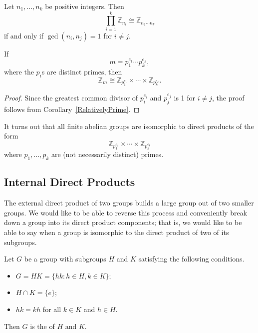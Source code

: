\begin{corollary}\label{RelativelyPrime}
Let $n_1, \ldots, n_k$ be positive integers. Then
\[
\prod_{i=1}^k {\mathbb Z}_{n_i} \cong {\mathbb Z}_{n_1 \cdots n_k}
\]
if and only if $\gcd( n_i, n_j) =1$ for $i \neq j$.
\end{corollary}

 
\begin{corollary}
If
\[
m = p_1^{e_1} \cdots  p_k^{e_k},
\]
where the $p_i$s are distinct primes, then
\[
{\mathbb Z}_m \cong {\mathbb Z}_{p_1^{e_1}} \times \cdots \times {\mathbb
Z}_{p_k^{e_k}}.
\]
\end{corollary}
 
 
\begin{proof}
Since the greatest common divisor of $p_i^{e_i}$ and $p_j^{e_j}$ is
1 for $i \neq j$, the proof follows from Corollary~\ref{RelativelyPrime}.
\end{proof}


\medskip


It turns out that all finite abelian groups are 
isomorphic to direct products of
the form
\[
{\mathbb Z}_{p_1^{e_1}} \times \cdots \times {\mathbb
Z}_{p_k^{e_k}}
\]
where $p_1, \ldots, p_k$ are (not necessarily distinct) primes.

 
 
\subsection{Internal Direct Products}
 

The external direct product of two groups builds a large group out of
two smaller groups.   We would like to be able to reverse this process
and conveniently break down a group into its direct product
components; that is, we would like to be able to say when a group is
isomorphic to the direct product of two of its subgroups.
 

Let $G$ be a group with subgroups $H$ and $K$ satisfying the following
conditions.
\begin{itemize}
 
\item
$G = HK = \{ hk : h \in H, k \in K  \}$;
 
\item
$H \cap K = \{ e \}$;
 
\item
$hk = kh$ for all $k \in K$ and $h \in H$.
 
\end{itemize}
Then $G$ is the  of $H$ and $K$.


